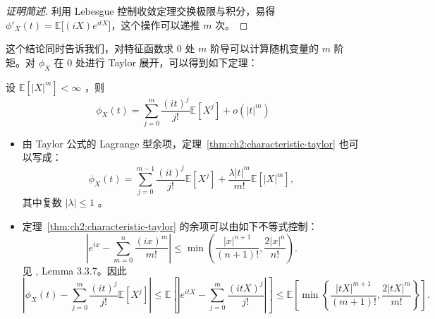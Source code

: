 \begin{proof}[证明简述]
利用 Lebesgue 控制收敛定理交换极限与积分，易得 $\phi'_X(t)=\mathbb{E}\big[(iX)e^{itX}\big]$，这个操作可以递推 $m$ 次。
\end{proof}


  这个结论同时告诉我们，对特征函数求 0 处 $m$ 阶导可以计算随机变量的 $m$ 阶矩。对 $\phi_X$ 在 0 处进行 Taylor 展开，可以得到如下定理：

\begin{theorem}
\label{thm:ch2:characteristic-taylor}

设 $\mathbb{E}[|X|^m]<\infty$ ，则\[ \phi_X(t)=\sum_{j=0}^m\frac{(it)^j}{j!}\mathbb{E}[X^j]+o(|t|^m) \]

\end{theorem}

\begin{remark}

\begin{itemize}
\tightlist
\item
  由 Taylor 公式的 Lagrange 型余项，定理~\ref{thm:ch2:characteristic-taylor} 也可以写成：
  \[  \phi_X(t)=\sum_{j=0}^{m-1}\frac{(it)^j}{j!}\mathbb{E}[X^j]+\frac{\lambda |t|^m}{m!}\mathbb{E}[|X|^m],
  \]  其中复数 $|\lambda|\le 1$ 。
\item
  定理~\ref{thm:ch2:characteristic-taylor} 的余项可以由如下不等式控制：
  \[  \left|e^{ix}-\sum_{m=0}^n\frac{(ix)^m}{m!}\right|\leq\min\left(\frac{|x|^{n+1}}{(n+1)!},\frac{2|x|^n}{n!}\right).
  \]  见 \cite{durrett2010}, Lemma 3.3.7。因此
  \[  \left| \phi_X(t) - \sum_{j=0}^m \frac{(it)^j}{j!}\mathbb{E}[X^j] \right| \leq \mathbb{E}\left[ \left| e^{itX} - \sum_{j=0}^m \frac{(itX)^j}{j!} \right| \right] \leq \mathbb{E}\left[ \min\left\{ \frac{|tX|^{m+1}}{(m+1)!}, \frac{2|tX|^m}{m!} \right\} \right].
  \]\end{itemize}
\end{remark}

